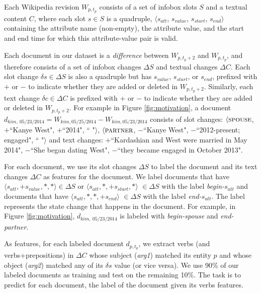 Each Wikipedia revision $W_{p, t_p}$ consists of a set of infobox slots $S$ and a textual content $C$, where each slot $s \in S$ is a quadruple, $\langle s_{att}$, $s_{value}$,  $s_{start}$, $s_{end} \rangle$ containing the attribute name (non-empty), the attribute value, and the start and end time for which this attribute-value pair is valid. 

Each document in our dataset is a \textit{difference} between $W_{p, t_p+2}$ and $W_{p, t_p}$, and therefore consists of a set of infobox changes $\Delta S$ and textual changes $\Delta C$. Each slot change $\delta s \in \Delta S$ is also a quadruple %
but has $s_{value}$,  $s_{start}$, or $s_{end}$, %
prefixed with $+$ or $-$ to indicate whether they are added or deleted in $W_{p, t_p+2}$. Similarly, each text change $\delta c \in \Delta C$ is prefixed with $+$ or $-$ to indicate whether they are added or deleted in $W_{p, t_p+2}$. For example in Figure \ref{fig:motivation}, a document $d_{kim,\ 05/23/2014} = W_{kim, 05/25/2014} - W_{kim, 05/23/2014}$ consists of slot changes: $\langle\textsc{spouse}$, \textbf{$+$}\footnotesize ``Kanye West"\normalsize,  $+$\footnotesize ``2014"\normalsize, \footnotesize`` "\normalsize$\rangle$, $\langle\textsc{partner}$, $-$\footnotesize``Kanye West"\normalsize,  $-$\footnotesize``2012-present; engaged"\normalsize, \footnotesize`` "\normalsize$\rangle$ and text changes: $+$\footnotesize``Kardashian and West were married in May 2014"\normalsize, $-$\footnotesize``She began dating West"\normalsize, $-$\footnotesize``they became engaged in October 2013"\normalsize.

For each document, we use its slot changes $\Delta S$ to label the document and its text changes $\Delta C$ as features for the document. We label documents that have $\langle s_{att}, +s_{value}, *, *\rangle \in \Delta S$ or $\langle s_{att}, *, +s_{start}, *\rangle$ $\in \Delta S$ with the label \textit{begin-}$s_{att}$ and documents that have $\langle s_{att}, *, *, +s_{end}\rangle$ $\in \Delta S$ with the label \textit{end-}$s_{att}$. The label represents the state change that happens in the document. For example, in Figure \ref{fig:motivation}, $d_{kim,\ 05/23/2014}$ is labeled with \textit{begin-spouse} and \textit{end-partner}. 

As features, for each labeled document $d_{p,t_p}$, we extract verbs (and verbs+prepositions) in $\Delta C$ whose subject (\textit{arg1}) matched its entity $p$ and whose object (\textit{arg2}) matched any of its $\delta s$ value (or vice versa). We use 90\% of our labeled documents as training and test on the remaining 10\%. The task is to predict for each document, the label of the document given its verbs features. 

